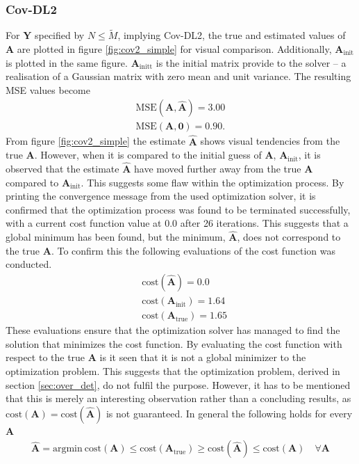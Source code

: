 \subsubsection{Cov-DL2}
For $\mathbf{Y}$ specified by $N \leq \widetilde{M}$, implying Cov-DL2, the true and estimated values of $\mathbf{A}$ are plotted in figure \ref{fig:cov2_simple} for visual comparison. 
Additionally, $\mathbf{A}_{\text{init}}$ is plotted in the same figure. $\mathbf{A}_{\text{initt}}$ is the initial matrix provide to the solver -- a realisation of a Gaussian matrix with zero mean and unit variance. 
The resulting MSE values become 
\begin{align*}
\text{MSE}(\mathbf{A}, \hat{\mathbf{A}}) = 3.00 \\
\text{MSE}(\mathbf{A}, \mathbf{0}) = 0.90.
\end{align*}
From figure \ref{fig:cov2_simple} the estimate $\hat{\mathbf{A}}$ shows visual tendencies from the true $\mathbf{A}$. 
However, when it is compared to the initial guess of $\textbf{A}$, $\mathbf{A}_{\text{init}}$, it is observed that the estimate $\hat{\mathbf{A}}$ have moved further away from the true $\mathbf{A}$ compared to $\mathbf{A}_{\text{init}}$. 
This suggests some flaw within the optimization process. 
By printing the convergence message from the used optimization solver, it is confirmed that the optimization process was found to be terminated successfully, with a current cost function value at $0.0$ after 26 iterations. 
This suggests that a global minimum has been found, but the minimum, $\hat{\mathbf{A}}$, does not correspond to the true $\mathbf{A}$. 
To confirm this the following evaluations of the cost function was conducted. 
\begin{align*}
&\text{cost}(\hat{\mathbf{A}}) = 0.0\\
&\text{cost}(\mathbf{A}_{\text{init}}) = 1.64\\
&\text{cost}(\mathbf{A}_{\text{true}}) = 1.65
\end{align*}
These evaluations ensure that the optimization solver has managed to find the solution that minimizes the cost function. 
By evaluating the cost function with respect to the true $\mathbf{A}$ is it seen that it is not a global minimizer to the optimization problem. 
This suggests that the optimization problem, derived in section \ref{sec:over_det}, do not fulfil the purpose.
However, it has to be mentioned that this is merely an interesting observation rather than a concluding results, as $\text{cost}(\textbf{A})=\text{cost}(\hat{\textbf{A}})$ is not guaranteed. In general the following holds for every $\textbf{A}$ 
\begin{align*}
\hat{\textbf{A}} = \text{argmin}\  \text{cost}(\textbf{A}) \leq \text{cost}(\textbf{A}_{\text{true}}) \geq \text{cost}(\hat{\textbf{A}}) \leq \text{cost}(\textbf{A})\quad \forall \textbf{A} 
\end{align*}  


